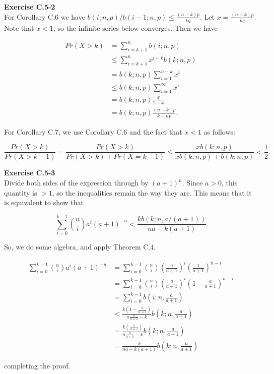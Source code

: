 \documentclass{article}
\begin{document}
\noindent\textbf{Exercise C.5-2}\\

For Corollary C.6 we have $b(i;n,p)/b(i-1;n,p) \leq \frac{(n-k)p}{kq}$.  Let $x = \frac{(n-k)p}{kq}$.  Note that $x < 1$, so the infinite series below converges. Then we have

\begin{align*}
Pr(X > k) &= \sum_{i=k+1}^n b(i;n,p) \\
&\leq \sum_{i=k+1}^n x^{i-k}b(k;n,p) \\
&= b(k;n,p) \sum_{i=1}^{n-k} x^i \\
&\leq b(k;n,p) \sum_{i=1}^\infty x^i \\
&= b(k;n,p) \frac{x}{1-x} \\
&= b(k;n,p) \frac{(n-k)p}{k-np}.
\end{align*}

For Corollary C.7, we use Corollary C.6 and the fact that $x < 1$ as follows:

\[ \frac{Pr(X > k)}{Pr(X>k-1)} = \frac{Pr(X>k)}{Pr(X>k)+Pr(X=k-1)} \leq \frac{xb(k;n,p)}{xb(k;n,p) + b(k;n,p)}  < \frac{1}{2}.\]

\noindent\textbf{Exercise C.5-3}\\

Divide both sides of the expression through by $(a+1)^n$. Since $a>0$, this quantity is $>1$, so the inequalities remain the way they are. This means that it is equivalent to show that

\[
\sum_{i=0}^{k-1} \binom{n}{i} a^i (a+1)^{-n} < \frac{kb(k;n,a/(a+1))}{na - k(a+1)}
\]

So, we do some algebra, and apply Theorem C.4.

\begin{align*}
\sum_{i=0}^{k-1} \binom{n}{i} a^i (a+1)^{-n} & = \sum_{i=0}^{k-1}\binom{n}{i} \left(\frac{a}{a+1}\right)^i \left( \frac{1}{a+1}\right)^{n-i}\\
&= \sum_{i=0}^{k-1}\binom{n}{i} \left(\frac{a}{a+1}\right)^i \left(1 - \frac{a}{a+1}\right)^{n-i}\\
&= \sum_{i=0}^{k-1}b(i;n,\frac{a}{a+1})\\
&< \frac{k\left(1-\frac{a}{a+1}\right)}{n \frac{a}{a+1} - k}b(k;n,\frac{a}{a+1})\\
&= \frac{k\left(\frac{1}{a+1}\right)}{n \frac{a}{a+1} - k}b(k;n,\frac{a}{a+1})\\
&= \frac{k}{n a - k(a+1)}b(k;n,\frac{a}{a+1})
\end{align*}

completing the proof.\\
\end{document}
